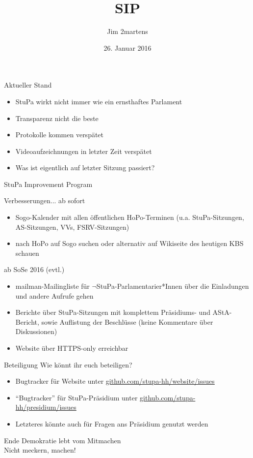 \documentclass{beamer}
\begin{document}
\author{Jim 2martens}
\title{SIP}
\date{26. Januar 2016}

\begin{frame}
  \titlepage
\end{frame}

\begin{frame}{Aktueller Stand}
  \begin{itemize}
    \item StuPa wirkt nicht immer wie ein ernsthaftes Parlament
    \item Transparenz nicht die beste
    \item Protokolle kommen verspätet
    \item Videoaufzeichnungen in letzter Zeit verspätet
    \item Was ist eigentlich auf letzter Sitzung passiert?
  \end{itemize}
\end{frame}

\begin{frame}
  \centering
  StuPa Improvement Program
\end{frame}

\begin{frame}{Verbesserungen...}
  ab sofort
  \begin{itemize}
    \item Sogo-Kalender mit allen öffentlichen HoPo-Terminen (u.a. StuPa-Sitzungen, AS-Sitzungen, VVs, FSRV-Sitzungen)
    \item nach HoPo auf Sogo suchen oder alternativ auf Wikiseite des heutigen KBS schauen
  \end{itemize}
  ab SoSe 2016 (evtl.)
  \begin{itemize}
    \item mailman-Mailingliste für \( \lnot \)StuPa-Parlamentarier*Innen über die Einladungen und andere Aufrufe gehen
    \item Berichte über StuPa-Sitzungen mit komplettem Präsidiums- und AStA-Bericht, sowie Auflistung der Beschlüsse (keine Kommentare über Diskussionen)
    \item Website über HTTPS-only erreichbar
  \end{itemize}
\end{frame}

\begin{frame}{Beteiligung}
  Wie könnt ihr euch beteiligen?
  \begin{itemize}
    \item Bugtracker für Website unter \url{github.com/stupa-hh/website/issues}
    \item "`Bugtracker"' für StuPa-Präsidium unter \url{github.com/stupa-hh/presidium/issues}
    \item Letzteres könnte auch für Fragen ans Präsidium genutzt werden
  \end{itemize}
\end{frame}

\begin{frame}{Ende}
  \centering
  Demokratie lebt vom Mitmachen \\
  Nicht meckern, machen!
\end{frame}
\end{document}
